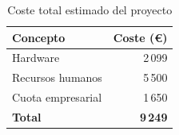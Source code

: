 \begin{table}[!ht]
      \centering
      \begin{tabular}{|l|r|}
            \hline
            \textbf{Concepto} & \textbf{Coste (€)} \\
            \hline
            Hardware          & 2\,099             \\
            Recursos humanos  & 5\,500             \\
            Cuota empresarial & 1\,650             \\
            \hline
            \textbf{Total}    & \textbf{9\,249}    \\
            \hline
      \end{tabular}
      \caption{Coste total estimado del proyecto}
      \label{tab:coste-total}
\end{table}